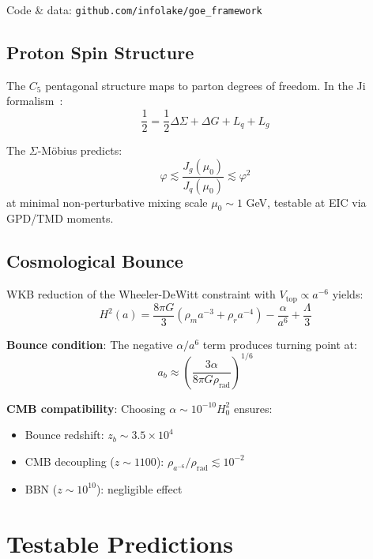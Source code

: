 \documentclass[twocolumn,preprintnumbers,amsmath,amssymb,superscriptaddress]{revtex4-2}
\newcommand{\Cfive}{C_5}
\newcommand{\varphig}{\varphi}
\begin{document}
\noindent Code \& data: \texttt{github.com/infolake/goe\_framework}

\subsection{Proton Spin Structure}

The $\Cfive$ pentagonal structure maps to parton degrees of freedom. In the Ji formalism~\cite{ji1997}:
\begin{equation}
\frac{1}{2} = \frac{1}{2}\Delta\Sigma + \Delta G + L_q + L_g
\end{equation}

The $\Sigma$-M\"obius predicts:
\begin{equation}
\boxed{\varphig \lesssim \frac{J_g(\mu_0)}{J_q(\mu_0)} \lesssim \varphig^2}
\end{equation}
at minimal non-perturbative mixing scale $\mu_0 \sim 1$ GeV, testable at EIC via GPD/TMD moments.

\subsection{Cosmological Bounce}

WKB reduction of the Wheeler-DeWitt constraint with $V_{\text{top}} \propto a^{-6}$ yields:
\begin{equation}
H^2(a) = \frac{8\pi G}{3}\left(\rho_m a^{-3} + \rho_r a^{-4}\right) - \frac{\alpha}{a^6} + \frac{\Lambda}{3}
\label{eq:cosmo}
\end{equation}

\textbf{Bounce condition}: The negative $\alpha/a^6$ term produces turning point at:
\begin{equation}
a_b \approx \left(\frac{3\alpha}{8\pi G \rho_{\text{rad}}}\right)^{1/6}
\end{equation}

\textbf{CMB compatibility}: Choosing $\alpha \sim 10^{-10} H_0^2$ ensures:
\begin{itemize}
\item Bounce redshift: $z_b \sim 3.5 \times 10^4$
\item CMB decoupling ($z \sim 1100$): $\rho_{a^{-6}}/\rho_{\text{rad}} \lesssim 10^{-2}$
\item BBN ($z \sim 10^{10}$): negligible effect
\end{itemize}

\section{Testable Predictions}
\end{document}
